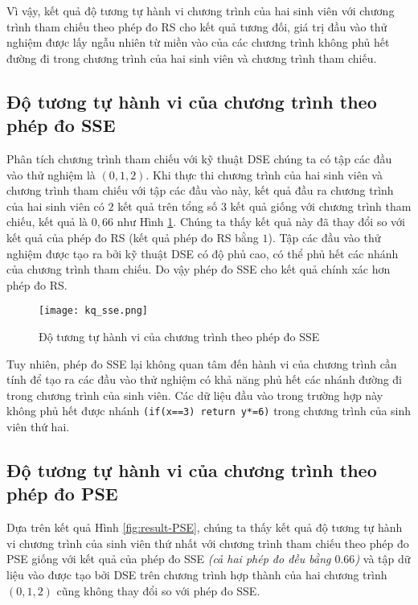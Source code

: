 Vì vậy, kết quả độ tương tự hành vi chương trình của hai sinh viên với chương trình tham chiếu theo phép đo RS cho kết quả tương đối, giá trị đầu vào thử nghiệm được lấy ngẫu nhiên từ miền vào của các chương trình không phủ hết đường đi trong chương trình của hai sinh viên và chương trình tham chiếu.

\subsection{Độ tương tự hành vi của chương trình theo phép đo SSE}

Phân tích chương trình tham chiếu với kỹ thuật DSE chúng ta có tập các đầu vào thử nghiệm là $(0, 1, 2)$. Khi thực thi chương trình của hai sinh viên và chương trình tham chiếu với tập các đầu vào này, kết quả đầu ra chương trình của hai sinh viên có $ 2 $ kết quả trên tổng số 3 kết quả giống với chương trình tham chiếu, kết quả là $0,66$ như Hình \ref{fig:results-SSE}. Chúng ta thấy kết quả này đã thay đổi so với kết quả của phép đo RS (kết quả phép đo RS bằng $ 1 $). Tập các đầu vào thử nghiệm được tạo ra bởi kỹ thuật DSE có độ phủ cao, có thể phủ hết các nhánh của chương trình tham chiếu. Do vậy phép đo SSE cho kết quả chính xác hơn phép đo RS.

\begin{figure}[H]
	\begin{center}
		\texttt{[image: kq\_sse.png]}
	\end{center}
	\caption{Độ tương tự hành vi của chương trình theo phép đo SSE}
	\label{fig:results-SSE}
\end{figure}

Tuy nhiên, phép đo SSE lại không quan tâm đến hành vi của chương trình cần tính để tạo ra các đầu vào thử nghiệm có khả năng phủ hết các nhánh đường đi trong chương trình của sinh viên. Các dữ liệu đầu vào trong trường hợp này không phủ hết được nhánh \texttt{(if(x==3) return y*=6)} trong chương trình của sinh viên thứ hai.

\subsection{Độ tương tự hành vi của chương trình theo phép đo PSE}
Dựa trên kết quả Hình \ref{fig:result-PSE}, chúng ta thấy kết quả độ tương tự hành vi chương trình của sinh viên thứ nhất với chương trình tham chiếu theo phép đo PSE giống với kết quả của phép đo SSE \textit{(cả hai phép đo đều bằng $ 0.66 $)} và tập dữ liệu vào được tạo bởi DSE trên chương trình hợp thành của hai chương trình $ (0, 1, 2) $ cũng không thay đổi so với phép đo SSE.

